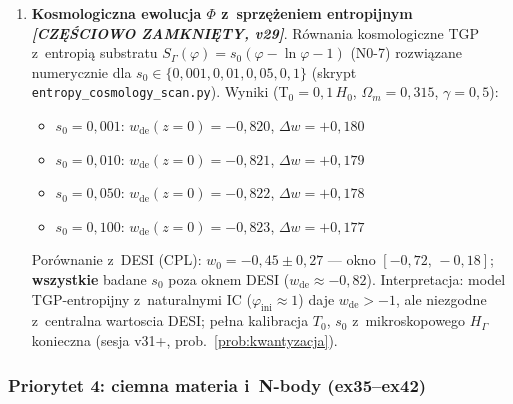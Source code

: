 
\begin{enumerate}[label=\textbf{O\arabic*}., start=22, nosep]
  \item \textbf{Kosmologiczna ewolucja $\Phi$ z~sprz\k{e}\.zeniem entropijnym
        \emph{[CZ\k{E}\'SCIOWO ZAMKNI\k{E}TY, v29]}}.
        R\'ownania kosmologiczne TGP z~entropi\k{a} substratu
        $S_\Gamma(\varphi) = s_0(\varphi - \ln\varphi - 1)$ (N0-7)
        rozwi\k{a}zane numerycznie dla $s_0 \in \{0{,}001, 0{,}01, 0{,}05, 0{,}1\}$
        (skrypt \texttt{entropy\_cosmology\_scan.py}).
        Wyniki (T$_0 = 0{,}1\,H_0$, $\Omega_m=0{,}315$, $\gamma=0{,}5$):
        \begin{itemize}[nosep]
          \item $s_0=0{,}001$: $w_{\mathrm{de}}(z{=}0) = -0{,}820$,\; $\Delta w = +0{,}180$
          \item $s_0=0{,}010$: $w_{\mathrm{de}}(z{=}0) = -0{,}821$,\; $\Delta w = +0{,}179$
          \item $s_0=0{,}050$: $w_{\mathrm{de}}(z{=}0) = -0{,}822$,\; $\Delta w = +0{,}178$
          \item $s_0=0{,}100$: $w_{\mathrm{de}}(z{=}0) = -0{,}823$,\; $\Delta w = +0{,}177$
        \end{itemize}
        Por\'ownanie z~DESI (CPL): $w_0 = -0{,}45 \pm 0{,}27$
        --- okno $[-0{,}72,\, -0{,}18]$; \textbf{wszystkie} badane $s_0$
        poza oknem DESI ($w_{\mathrm{de}} \approx -0{,}82$).
        Interpretacja: model TGP-entropijny z~naturalnymi IC
        ($\varphi_{\mathrm{ini}} \approx 1$) daje $w_{\mathrm{de}} > -1$,
        ale niezgodne z~centralna wartoscia DESI;
        pe\l{}na kalibracja $T_0$, $s_0$ z~mikroskopowego $H_\Gamma$
        konieczna (sesja v31+, prob.~\ref{prob:kwantyzacja}).
\end{enumerate}

\subsubsection{Priorytet 4: ciemna materia i~N-body (ex35--ex42)}

